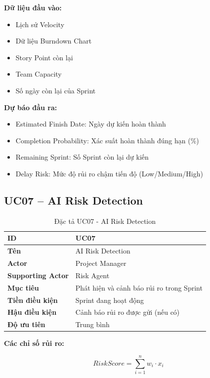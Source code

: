 \documentclass[12pt,a4paper]{report}
\begin{document}
\textbf{Dữ liệu đầu vào:}

\begin{itemize}
\item Lịch sử Velocity
\item Dữ liệu Burndown Chart
\item Story Point còn lại
\item Team Capacity
\item Số ngày còn lại của Sprint
\end{itemize}

\textbf{Dự báo đầu ra:}

\begin{itemize}
\item Estimated Finish Date: Ngày dự kiến hoàn thành
\item Completion Probability: Xác suất hoàn thành đúng hạn (\%)
\item Remaining Sprint: Số Sprint còn lại dự kiến
\item Delay Risk: Mức độ rủi ro chậm tiến độ (Low/Medium/High)
\end{itemize}

\subsection{UC07 -- AI Risk Detection}

\begin{table}[H]
\centering
\caption{Đặc tả UC07 - AI Risk Detection}
\begin{tabular}{|p{4cm}|p{11cm}|}
\hline
\textbf{ID} & UC07 \\
\hline
\textbf{Tên} & AI Risk Detection \\
\hline
\textbf{Actor} & Project Manager \\
\hline
\textbf{Supporting Actor} & Risk Agent \\
\hline
\textbf{Mục tiêu} & Phát hiện và cảnh báo rủi ro trong Sprint \\
\hline
\textbf{Tiền điều kiện} & Sprint đang hoạt động \\
\hline
\textbf{Hậu điều kiện} & Cảnh báo rủi ro được gửi (nếu có) \\
\hline
\textbf{Độ ưu tiên} & Trung bình \\
\hline
\end{tabular}
\end{table}

\textbf{Các chỉ số rủi ro:}

\[
RiskScore = \sum_{i=1}^{n} w_i \cdot x_i
\]
\end{document}
